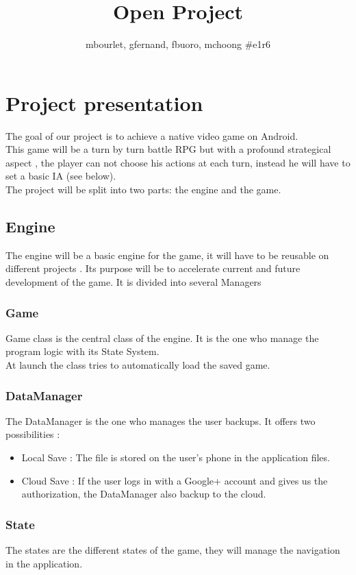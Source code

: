\documentclass[16pt, oneside]{report}
\title{{\myfont Open Project}}
\author{mbourlet, gfernand, fbuoro, mchoong \#e1r6}
\date{}
\begin{document}
\maketitle

\chapter{Project presentation}
The goal of our project is to achieve a native video game on Android. \\
This game will be a turn by turn battle RPG but with a profound strategical aspect , the player can not choose his actions at each turn, instead he will have to set a basic IA (see below). \\
The project will be split into two parts: the engine and the game.

\section{Engine}
The engine will be a basic engine for the game, it will have to be reusable on different projects . Its purpose will be to accelerate current and future development of the game. It is divided into several Managers

\subsection{Game}
Game class is the central class of the engine. It is the one who manage the program logic with its State System. \\
At launch the class tries to automatically load the saved game.

\subsection{DataManager}
The DataManager is the one who manages the user backups. It offers two possibilities :
\begin {itemize}
	\item Local Save : The file is stored on the user's phone in the application files.
	\item Cloud Save : If the user logs in with a Google+ account and gives us the authorization, the DataManager also backup to the cloud. \\ 
\end {itemize}


\subsection{State}
The states are the different states of the game, they will manage the navigation in the application.\\
\end{document}
